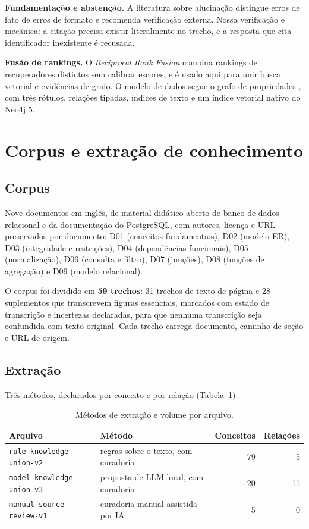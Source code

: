 \documentclass[12pt]{article}
\begin{document}
\textbf{Fundamentação e abstenção.} A literatura sobre alucinação \cite{ji2023} distingue erros de
fato de erros de formato e recomenda verificação externa. Nossa verificação é mecânica: a citação
precisa existir literalmente no trecho, e a resposta que cita identificador inexistente é
recusada.

\textbf{Fusão de rankings.} O \emph{Reciprocal Rank Fusion} \cite{cormack2009} combina rankings de
recuperadores distintos sem calibrar escores, e é usado aqui para unir busca vetorial e evidências
de grafo. O modelo de dados segue o grafo de propriedades \cite{robinson2015}, com três rótulos,
relações tipadas, índices de texto e um índice vetorial nativo do Neo4j 5.

\section{Corpus e extração de conhecimento}

\subsection{Corpus}

Nove documentos em inglês, de material didático aberto de banco de dados relacional e da
documentação do PostgreSQL, com autores, licença e URL preservados por documento: D01 (conceitos
fundamentais), D02 (modelo ER), D03 (integridade e restrições), D04 (dependências funcionais), D05
(normalização), D06 (consulta e filtro), D07 (junções), D08 (funções de agregação) e D09 (modelo
relacional).

O corpus foi dividido em \textbf{59 trechos}: 31 trechos de texto de página e 28 suplementos que
transcrevem figuras essenciais, marcados com estado de transcrição e incertezas declaradas, para
que nenhuma transcrição seja confundida com texto original. Cada trecho carrega documento, caminho
de seção e URL de origem.

\subsection{Extração}

Três métodos, declarados por conceito e por relação (Tabela~\ref{tab:metodos}):

\begin{table}[h]
\centering
\caption{Métodos de extração e volume por arquivo.}
\label{tab:metodos}
\footnotesize
\begin{tabular}{@{}llrr@{}}
\toprule
Arquivo & Método & Conceitos & Relações \\
\midrule
\texttt{rule-knowledge-union-v2} & regras sobre o texto, com curadoria & 79 & 5 \\
\texttt{model-knowledge-union-v3} & proposta de LLM local, com curadoria & 20 & 11 \\
\texttt{manual-source-review-v1} & curadoria manual assistida por IA & 5 & 0 \\
\bottomrule
\end{tabular}
\end{table}
\end{document}
